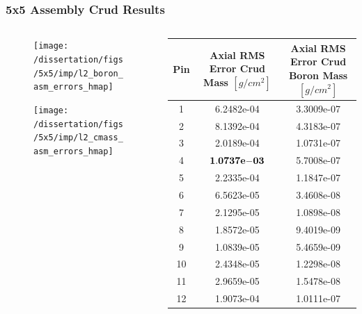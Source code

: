 \documentclass[t, pdftex]{beamer}
\begin{document}
\begin{frame}
\frametitle{5x5 Assembly Crud Results}
\vspace{-42pt}
\begin{columns}
    \begin{column}{0.5\textwidth}
        \begin{figure}[H]%
            \texttt{[image: /dissertation/figs/5x5/imp/l2\_boron\_asm\_errors\_hmap]}
        \end{figure}
        \vspace{-26pt}
        \begin{figure}[H]%
            \texttt{[image: /dissertation/figs/5x5/imp/l2\_cmass\_asm\_errors\_hmap]}
        \end{figure}
    \end{column}
    \begin{column}{0.5\textwidth}
        \begin{table}[h]
            \tiny
            \begin{center}
                \begin{tabular}[h]{|c|C|C|}
                    \hline
                    Pin  & Axial RMS Error Crud Mass $[g/cm^2]$ & Axial RMS Error Crud Boron Mass $[g/cm^2]$ \\
                    \hline {}  & 6.2482e-04 &  3.3009e-07  \\
                    2  & 8.1392e-04 &  4.3183e-07  \\
                    3  & 2.0189e-04 &  1.0731e-07  \\
                    4  & $\mathbf{1.0737\mathrm{\bf e-}03}$ &  5.7008e-07  \\
                    5  & 2.2335e-04 &  1.1847e-07  \\
                    6  & 6.5623e-05 &  3.4608e-08  \\
                    7  & 2.1295e-05 &  1.0898e-08  \\
                    8  & 1.8572e-05 &  9.4019e-09  \\
                    9  & 1.0839e-05 &  5.4659e-09  \\
                    10 & 2.4348e-05 &  1.2298e-08  \\
                    11 & 2.9659e-05 &  1.5478e-08  \\
                    12 & 1.9073e-04 &  1.0111e-07  \\

\end{tabular}
\end{center}
\end{table}
\end{column}
\end{columns}
\end{frame}
\end{document}
